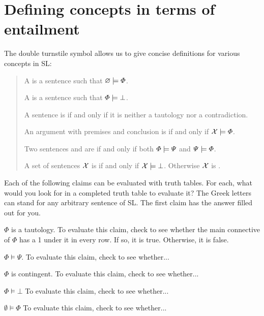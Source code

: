 \section{Defining concepts in terms of entailment}


The double turnstile symbol allows us to give concise definitions for various concepts in SL:
\begin{quote}
A  is a sentence \metaA{}  such that $\varnothing\models\varPhi{}$.

A  is a sentence \metaA{} such that $\varPhi{}\models\bot$.

A sentence is  if and only if it is neither a tautology nor a contradiction.

An argument with premises \metaSetX{} and conclusion \metaA{} is  if and only if $\mathcal{X}{}\models\varPhi{}$.

Two sentences \metaA{} and \metaB{} are  if and only if both $\varPhi{}\models\varPsi{}$ and $\varPsi{}\models\varPhi{}$.

A set of sentences $\mathcal{X}{}$ is  if and only if $\mathcal{X}{}\models \bot$. Otherwise $\mathcal{X}{}$ is .\label{def.consistencySL}

 \end{quote}




\practiceproblems


\solutions
\problempart
\label{pr.treesetup}
Each of the following claims can be evaluated with truth tables. For each, what would you look for in a completed truth table to evaluate it? The Greek letters can stand for any arbitrary sentence of SL. The first claim has the answer filled out for you.

\begin{earg}
		\item[0.] $\Phi$ is a tautology.
		To evaluate this claim, check to see whether the main connective of $\Phi$ has a 1 under it in every row. If so, it is true. Otherwise, it is false.
		\item $\Phi \models \Psi$. 
		To evaluate this claim, check to see whether... 		
		\item $\Phi$ is contingent. To evaluate this claim, check to see whether... 
		\item $\Phi \models \bot$ 	To evaluate this claim, check to see whether... 
		\item $\emptyset \models \Phi$ 	To evaluate this claim, check to see whether... 
	\end{earg}

